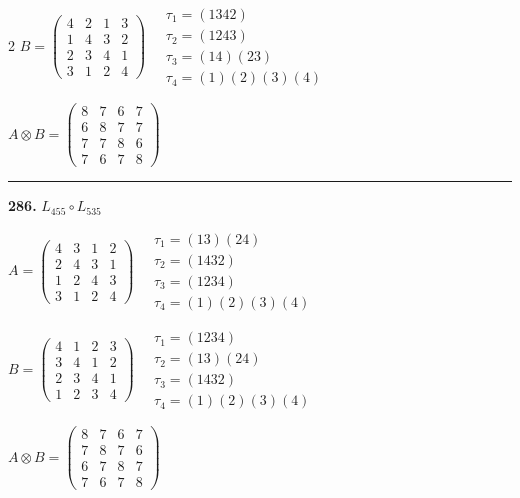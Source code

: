 \begin{multicols}{2}
$B = \begin{pmatrix} 4 & 2 & 1 & 3 \\ 1 & 4 & 3 & 2 \\ 2 & 3 & 4 & 1 \\ 3 & 1 & 2 & 4 \end{pmatrix} \quad \begin{matrix} \tau_{1}=(1 3 4 2) \\ \tau_{2}=(1 2 4 3) \\ \tau_{3}=(1 4)(2 3) \\ \tau_{4}=(1)(2)(3)(4) \end{matrix}$

$A \otimes B = \begin{pmatrix} 8 & 7 & 6 & 7 \\ 6 & 8 & 7 & 7 \\ 7 & 7 & 8 & 6 \\ 7 & 6 & 7 & 8 \end{pmatrix}$

\vspace{0.3em}
\hrule
\vspace{0.3em}

\noindent\textbf{286.} $L_{455} \circ L_{535}$

$A = \begin{pmatrix} 4 & 3 & 1 & 2 \\ 2 & 4 & 3 & 1 \\ 1 & 2 & 4 & 3 \\ 3 & 1 & 2 & 4 \end{pmatrix} \quad \begin{matrix} \tau_{1}=(1 3)(2 4) \\ \tau_{2}=(1 4 3 2) \\ \tau_{3}=(1 2 3 4) \\ \tau_{4}=(1)(2)(3)(4) \end{matrix}$

$B = \begin{pmatrix} 4 & 1 & 2 & 3 \\ 3 & 4 & 1 & 2 \\ 2 & 3 & 4 & 1 \\ 1 & 2 & 3 & 4 \end{pmatrix} \quad \begin{matrix} \tau_{1}=(1 2 3 4) \\ \tau_{2}=(1 3)(2 4) \\ \tau_{3}=(1 4 3 2) \\ \tau_{4}=(1)(2)(3)(4) \end{matrix}$

$A \otimes B = \begin{pmatrix} 8 & 7 & 6 & 7 \\ 7 & 8 & 7 & 6 \\ 6 & 7 & 8 & 7 \\ 7 & 6 & 7 & 8 \end{pmatrix}$


\end{multicols}

